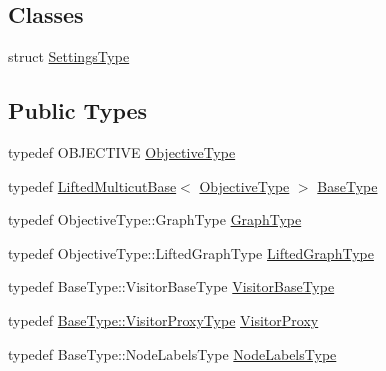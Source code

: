 \subsection*{Classes}
\begin{DoxyCompactItemize}
\item 
struct \hyperlink{structnifty_1_1graph_1_1opt_1_1lifted__multicut_1_1LiftedMulticutAndresKernighanLin_1_1SettingsType}{Settings\+Type}
\end{DoxyCompactItemize}
\subsection*{Public Types}
\begin{DoxyCompactItemize}
\item 
typedef O\+B\+J\+E\+C\+T\+I\+VE \hyperlink{classnifty_1_1graph_1_1opt_1_1lifted__multicut_1_1LiftedMulticutAndresKernighanLin_a31b45ec18fa430d4f6231a60395b4b14}{Objective\+Type}
\item 
typedef \hyperlink{classnifty_1_1graph_1_1opt_1_1lifted__multicut_1_1LiftedMulticutBase}{Lifted\+Multicut\+Base}$<$ \hyperlink{classnifty_1_1graph_1_1opt_1_1lifted__multicut_1_1LiftedMulticutAndresKernighanLin_a31b45ec18fa430d4f6231a60395b4b14}{Objective\+Type} $>$ \hyperlink{classnifty_1_1graph_1_1opt_1_1lifted__multicut_1_1LiftedMulticutAndresKernighanLin_af7916e019d2d26a408f8802b4f381c41}{Base\+Type}
\item 
typedef Objective\+Type\+::\+Graph\+Type \hyperlink{classnifty_1_1graph_1_1opt_1_1lifted__multicut_1_1LiftedMulticutAndresKernighanLin_a0554f7c914a8ee2889c43a103be35397}{Graph\+Type}
\item 
typedef Objective\+Type\+::\+Lifted\+Graph\+Type \hyperlink{classnifty_1_1graph_1_1opt_1_1lifted__multicut_1_1LiftedMulticutAndresKernighanLin_a09196b4e626fa7d810bb8a62f6b4b3cb}{Lifted\+Graph\+Type}
\item 
typedef Base\+Type\+::\+Visitor\+Base\+Type \hyperlink{classnifty_1_1graph_1_1opt_1_1lifted__multicut_1_1LiftedMulticutAndresKernighanLin_abce2decf7c7b89756c9acdfd70b8dc22}{Visitor\+Base\+Type}
\item 
typedef \hyperlink{classnifty_1_1graph_1_1opt_1_1common_1_1SolverBase_ad209b469b3bc9fc0fc14e9fed4d09075}{Base\+Type\+::\+Visitor\+Proxy\+Type} \hyperlink{classnifty_1_1graph_1_1opt_1_1lifted__multicut_1_1LiftedMulticutAndresKernighanLin_aebeb302942c88e4dfb381c4e4b71e8eb}{Visitor\+Proxy}
\item 
typedef Base\+Type\+::\+Node\+Labels\+Type \hyperlink{classnifty_1_1graph_1_1opt_1_1lifted__multicut_1_1LiftedMulticutAndresKernighanLin_a93990ac2b7ec99743b4765134a76ffe0}{Node\+Labels\+Type}
\end{DoxyCompactItemize}

